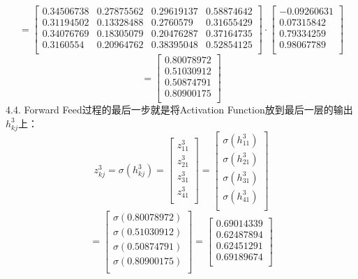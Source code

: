 \documentclass[a4paper,12pt,oneside]{book}
\begin{document}
\begin{equation*}
    = \begin{bmatrix}
        0.34506738 & 0.27875562 & 0.29619137 & 0.58874642\\
        0.31194502 & 0.13328488 & 0.2760579 & 0.31655429\\
        0.34076769 & 0.18305079 & 0.20476287 & 0.37164735\\
        0.3160554  & 0.20964762 & 0.38395048 & 0.52854125\\
    \end{bmatrix} \cdot
    \begin{bmatrix}
        -0.09260631\\
        0.07315842\\
        0.79334259\\
        0.98067789\\
    \end{bmatrix}
\end{equation*}
\begin{equation*}
    = \begin{bmatrix}
       0.80078972\\
       0.51030912\\
       0.50874791\\
       0.80900175\\
    \end{bmatrix}
\end{equation*}
4.4. Forward Feed过程的最后一步就是将Activation Function放到最后一层的输出$h^3_{kj}$上：
\begin{equation*}
    z^3_{kj} = \sigma(h^3_{kj})
    = \begin{bmatrix}
        z^3_{11} \\
        z^3_{21} \\
        z^3_{31} \\
        z^3_{41} \\
    \end{bmatrix}
    = \begin{bmatrix}
        \sigma(h^3_{11}) \\
        \sigma(h^3_{21}) \\
        \sigma(h^3_{31}) \\
        \sigma(h^3_{41}) \\
    \end{bmatrix}
\end{equation*}
\begin{equation*}
    = \begin{bmatrix}
        \sigma(0.80078972) \\
        \sigma(0.51030912) \\
        \sigma(0.50874791) \\
        \sigma(0.80900175) \\
    \end{bmatrix}
    = \begin{bmatrix}
       0.69014339\\
       0.62487894\\
       0.62451291\\
       0.69189674\\
    \end{bmatrix}
\end{equation*}
\end{document}

